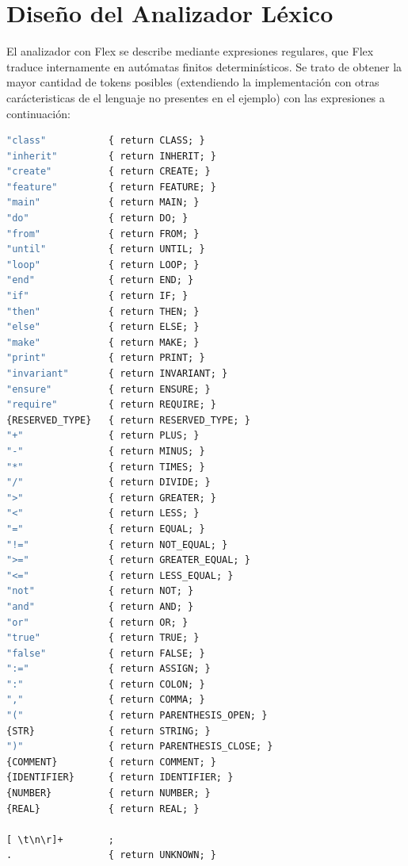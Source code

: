 \documentclass[a4paper,12pt]{article}
\begin{document}
\vspace{4mm}

\vspace{6mm}
\section{Diseño del Analizador Léxico}
\vspace{4mm}
El analizador con Flex se describe mediante expresiones regulares, que Flex traduce internamente en autómatas finitos determinísticos.
Se trato de obtener la mayor cantidad de tokens posibles (extendiendo la implementación con otras carácteristicas de el lenguaje no presentes en el ejemplo) con las expresiones a
continuación:

\begin{lstlisting}[language=Eiffel, style=myeiffel]
"class"           { return CLASS; }
"inherit"         { return INHERIT; }
"create"          { return CREATE; }
"feature"         { return FEATURE; }
"main"            { return MAIN; }
"do"              { return DO; }
"from"            { return FROM; }
"until"           { return UNTIL; }
"loop"            { return LOOP; }
"end"             { return END; }
"if"              { return IF; }
"then"            { return THEN; }
"else"            { return ELSE; }
"make"            { return MAKE; }
"print"           { return PRINT; }
"invariant"       { return INVARIANT; }
"ensure"          { return ENSURE; }
"require"         { return REQUIRE; }
{RESERVED_TYPE}   { return RESERVED_TYPE; }
"+"               { return PLUS; }
"-"               { return MINUS; }
"*"               { return TIMES; }
"/"               { return DIVIDE; }
">"               { return GREATER; }
"<"               { return LESS; }
"="               { return EQUAL; }
"!="              { return NOT_EQUAL; }
">="              { return GREATER_EQUAL; }
"<="              { return LESS_EQUAL; }
"not"             { return NOT; }
"and"             { return AND; }
"or"              { return OR; }
"true"            { return TRUE; }
"false"           { return FALSE; }
":="              { return ASSIGN; }
":"               { return COLON; }
","               { return COMMA; }
"("               { return PARENTHESIS_OPEN; }
{STR}             { return STRING; }
")"               { return PARENTHESIS_CLOSE; }
{COMMENT}         { return COMMENT; }
{IDENTIFIER}      { return IDENTIFIER; }
{NUMBER}          { return NUMBER; }
{REAL}            { return REAL; }

[ \t\n\r]+        ;
.                 { return UNKNOWN; }
\end{lstlisting}
\end{document}
